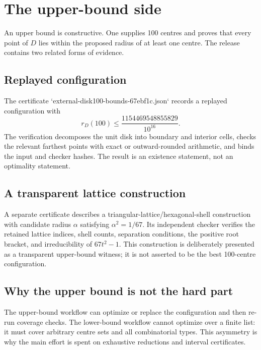 \section{The upper-bound side}
An upper bound is constructive. One supplies 100 centres and proves that every point of $D$ lies within the proposed radius of at least one centre. The release contains two related forms of evidence.

\subsection{Replayed configuration}
The certificate `external-disk100-bounds-67ebf1c.json` records a replayed configuration with
\[
 r_D(100)\le \frac{1154469548855829}{10^{16}}.
\]
The verification decomposes the unit disk into boundary and interior cells, checks the relevant farthest points with exact or outward-rounded arithmetic, and binds the input and checker hashes. The result is an existence statement, not an optimality statement.

\subsection{A transparent lattice construction}
A separate certificate describes a triangular-lattice/hexagonal-shell construction with candidate radius $\alpha$ satisfying $\alpha^2=1/67$. Its independent checker verifies the retained lattice indices, shell counts, separation conditions, the positive root bracket, and irreducibility of $67t^2-1$. This construction is deliberately presented as a transparent upper-bound witness; it is not asserted to be the best 100-centre configuration.

\subsection{Why the upper bound is not the hard part}
The upper-bound workflow can optimize or replace the configuration and then re-run coverage checks. The lower-bound workflow cannot optimize over a finite list: it must cover arbitrary centre sets and all combinatorial types. This asymmetry is why the main effort is spent on exhaustive reductions and interval certificates.

